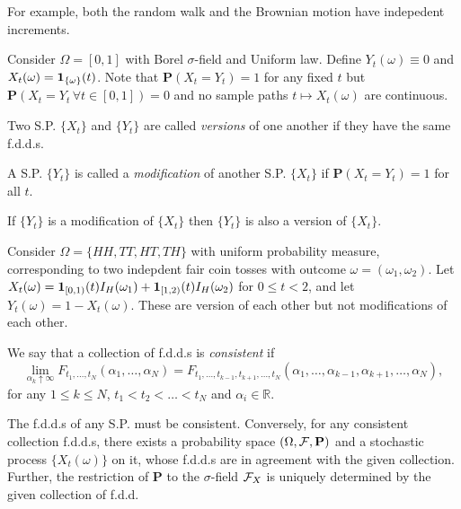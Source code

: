 \begin{remark*}
For example, both the random walk and the Brownian motion have indepedent increments.
\end{remark*}

\begin{example*}
Consider $\Omega = [0,1]$ with Borel $\sigma$-field and Uniform law. Define $Y_t(\omega) \equiv 0$ and $X_t(\omega) = \mathbf{1}_{\{\omega\}}(t)$. Note that $\mathbf P(X_t=Y_t)=1$ for any fixed $t$ but $\mathbf P(X_t=Y_t \, \forall t\in[0,1])=0$ and no sample paths $t \mapsto X_t(\omega)$ are continuous.
\end{example*}

\begin{definition*}
Two S.P. $\{X_t\}$ and $\{Y_t\}$ are called \emph{versions} of one another if they have the same f.d.d.s.
\end{definition*}

\begin{definition*}
A S.P. $\{Y_t\}$ is called a \emph{modification} of another S.P. $\{X_t\}$ if $\mathbf P(X_t = Y_t) = 1$ for all $t$.
\end{definition*}

\begin{exercise*}
If $\{Y_t\}$ is a modification of $\{X_t\}$ then $\{Y_t\}$ is also a version of $\{X_t\}$.
\end{exercise*}

\begin{example*}
Consider $\Omega = \{HH,TT,HT,TH\}$ with uniform probability measure, corresponding to two indepdent fair coin tosses with outcome $\omega=(\omega_1,\omega_2)$. Let $X_t(\omega) = \mathbf{1}_{[0,1)}(t)I_H(\omega_1) + \mathbf{1}_{[1,2)}(t)I_H(\omega_2)$ for $0\leq t<2$, and let $Y_t(\omega) = 1-X_t(\omega)$. These are version of each other but not modifications of each other.
\end{example*}

\begin{definition*}
We say that a collection of f.d.d.s is \emph{consistent} if 
\[
	\lim_{\alpha_k \uparrow \infty} F_{t_1,\dots,t_N}(\alpha_1,\dots,\alpha_N) = F_{t_1,\dots,t_{k-1},t_{k+1},\dots,t_N} (\alpha_1,\dots,\alpha_{k-1},\alpha_{k+1},\dots,\alpha_N),
\]
for any $1\leq k\leq N$, $t_1<t_2<\dots<t_N$ and $\alpha_i\in\mathbb R$.
\end{definition*}

\begin{proposition*}
The f.d.d.s of any S.P. must be consistent. Conversely, for any consistent collection f.d.d.s, there exists a probability space $(\Omega, \mathcal{F},\mathbf P)$ and a stochastic process $\{X_t(\omega)\}$ on it, whose f.d.d.s are in agreement with the given collection. Further, the restriction of $\mathbf P$ to the $\sigma$-field $\mathcal{F}_X$ is uniquely determined by the given collection of f.d.d.
\end{proposition*}

